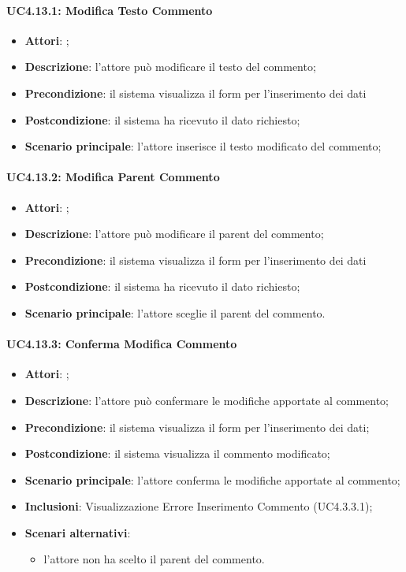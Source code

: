\paragraph{UC4.13.1: Modifica Testo Commento}
\label{UC4.13.1}
\begin{itemize}
\item \textbf{Attori}: ;
\item \textbf{Descrizione}: l'attore può modificare il testo del commento;	
\item \textbf{Precondizione}: il sistema visualizza il form per l'inserimento dei dati	
\item \textbf{Postcondizione}: il sistema ha ricevuto il dato richiesto;	
\item \textbf{Scenario principale}:
l'attore inserisce il testo modificato del commento;	
\end{itemize}

\paragraph{UC4.13.2: Modifica Parent Commento}
\label{UC4.13.2}
\begin{itemize}
\item \textbf{Attori}: ;
\item \textbf{Descrizione}: l'attore può modificare il parent del commento;	
\item \textbf{Precondizione}: il sistema visualizza il form per l'inserimento dei dati	
\item \textbf{Postcondizione}: il sistema ha ricevuto il dato richiesto;	
\item \textbf{Scenario principale}:
l'attore sceglie il parent del commento.
\end{itemize}

\paragraph{UC4.13.3: Conferma Modifica Commento}
\label{UC4.13.3}
\begin{itemize}
\item \textbf{Attori}: ;
\item \textbf{Descrizione}: l’attore può confermare le modifiche apportate al commento;	
\item \textbf{Precondizione}: il sistema visualizza il form per l'inserimento dei dati;	
\item \textbf{Postcondizione}: il sistema visualizza il commento modificato;	
\item \textbf{Scenario principale}:
l’attore conferma le modifiche apportate al commento;	
\item \textbf{Inclusioni}:
Visualizzazione Errore Inserimento Commento (UC4.3.3.1);
\item \textbf{Scenari alternativi}:
\begin{itemize}
\item l'attore non ha scelto il parent del commento. 
\end{itemize}
\end{itemize}

